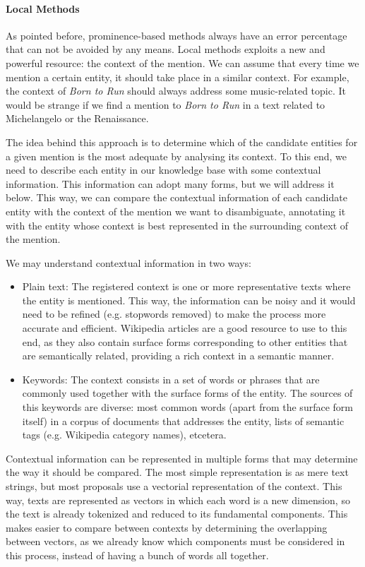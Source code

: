 \paragraph{Local Methods}

As pointed before, prominence-based methods always have an error percentage that can not be avoided by any means. Local methods exploits a new and powerful resource: the context of the mention. We can assume that every time we mention a certain entity, it should take place in a similar context. For example, the context of \emph{Born to Run} should always address some music-related topic. It would be strange if we find a mention to \emph{Born to Run} in a text related to Michelangelo or the Renaissance.

The idea behind this approach is to determine which of the candidate entities for a given mention is the most adequate by analysing its context. To this end, we need to describe each entity in our knowledge base with some contextual information. This information can adopt many forms, but we will address it below. This way, we can compare the contextual information of each candidate entity with the context of the mention we want to disambiguate, annotating it with the entity whose context is best represented in the surrounding context of the mention.

We may understand contextual information in two ways:

\begin{itemize}
\item Plain text: The registered context is one or more representative texts where the entity is mentioned. This way, the information can be noisy and it would need to be refined (e.g. stopwords removed) to make the process more accurate and efficient. Wikipedia articles are a good resource to use to this end, as they also contain surface forms corresponding to other entities that are semantically related, providing a rich context in a semantic manner.
\item Keywords: The context consists in a set of words or phrases that are commonly used together with the surface forms of the entity. The sources of this keywords are diverse: most common words (apart from the surface form itself) in a corpus of documents that addresses the entity, lists of semantic tags (e.g. Wikipedia category names), etcetera.
\end{itemize}

Contextual information can be represented in multiple forms that may determine the way it should be compared. The most simple representation is as mere text strings, but most proposals use a vectorial representation of the context. This way, texts are represented as vectors in which each word is a new dimension, so the text is already tokenized and reduced to its fundamental components. This makes easier to compare between contexts by determining the overlapping between vectors, as we already know which components must be considered in this process, instead of having a bunch of words all together.

